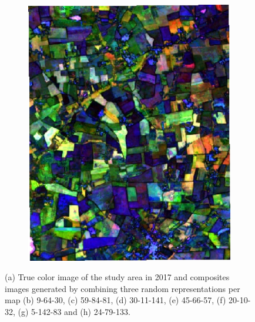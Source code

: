 \documentclass[journal,article,submit,pdftex,moreauthors]{Definitions/mdpi}
\begin{document}
\begin{figure}[H]
\begin{subfigure}[t]{0.23\linewidth}
	\includegraphics[width=0.95\linewidth]{figures/aes_1_layer_mse_results/composites/composite_image_2479133.pdf}
    \caption{}
	\label{fig:color_map_h}
	\end{subfigure}
	\caption{(a) True color image of the study area in 2017 and composites images generated by combining three random representations per map (b) 9-64-30, (c) 59-84-81, (d) 30-11-141, (e) 45-66-57, (f) 20-10-32, (g) 5-142-83 and (h) 24-79-133.}
	\label{color_maps}
\end{figure}
\end{document}
